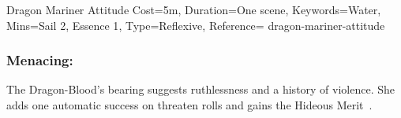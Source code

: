 \begin{Charm}{Dragon Mariner Attitude}{%
    Cost=5m,
    Duration=One scene,
    Keywords=Water,
    Mins={Sail 2, Essence 1},
    Type=Reflexive,
    Reference=\cite*[p.~257]{db}
}{dragon-mariner-attitude}
    \subsubsection{Menacing:}
    The Dragon-Blood's bearing suggests ruthlessness and a history of violence. She
    adds one automatic success on threaten rolls and gains the Hideous
    Merit~\parencite*[p.~162]{ex3}.
\end{Charm}


\printbibliography[title=References]

